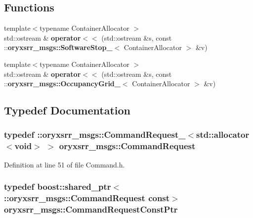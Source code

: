 \subsection*{\-Functions}
\begin{DoxyCompactItemize}
\item 
{\footnotesize template$<$typename Container\-Allocator $>$ }\\std\-::ostream \& {\bf operator$<$$<$} (std\-::ostream \&s, const \-::{\bf oryxsrr\-\_\-msgs\-::\-Software\-Stop\-\_\-}$<$ \-Container\-Allocator $>$ \&v)
\item 
{\footnotesize template$<$typename Container\-Allocator $>$ }\\std\-::ostream \& {\bf operator$<$$<$} (std\-::ostream \&s, const \-::{\bf oryxsrr\-\_\-msgs\-::\-Occupancy\-Grid\-\_\-}$<$ \-Container\-Allocator $>$ \&v)
\end{DoxyCompactItemize}


\subsection{\-Typedef \-Documentation}
\subsubsection[{\-Command\-Request}]{\setlength{\rightskip}{0pt plus 5cm}typedef \-::{\bf oryxsrr\-\_\-msgs\-::\-Command\-Request\-\_\-}$<$std\-::allocator$<$void$>$ $>$ {\bf oryxsrr\-\_\-msgs\-::\-Command\-Request}}\label{namespaceoryxsrr__msgs_abbb46c5b4d3436adf2bca61a0f353a95}


\-Definition at line 51 of file \-Command.\-h.

\subsubsection[{\-Command\-Request\-Const\-Ptr}]{\setlength{\rightskip}{0pt plus 5cm}typedef boost\-::shared\-\_\-ptr$<$ \-::{\bf oryxsrr\-\_\-msgs\-::\-Command\-Request} const$>$ {\bf oryxsrr\-\_\-msgs\-::\-Command\-Request\-Const\-Ptr}}\label{namespaceoryxsrr__msgs_a7b5eec925feb81ab0edcf9a65ad285f9}


